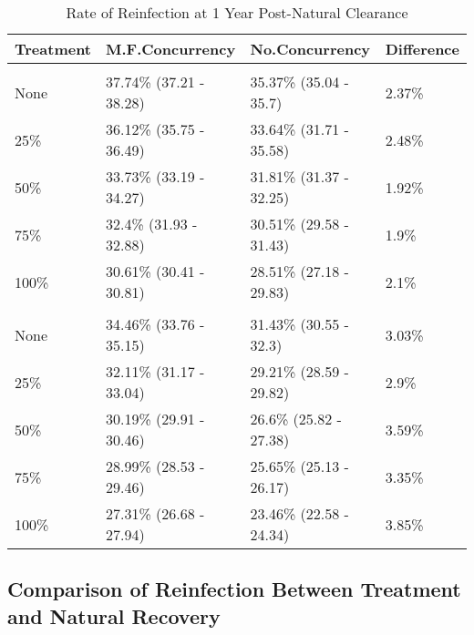 \documentclass [11pt, proquest] {uwthesis}[2015/03/03]
\begin{document}
\begin{table}

\caption{\label{tab:natclear6}Rate of Reinfection at 1 Year Post-Natural Clearance}
\centering
\begin{tabular}[t]{llll}
\toprule
Treatment & M.F.Concurrency & No.Concurrency & Difference\\
\midrule
\addlinespace[0.3em]
\multicolumn{4}{l}{\textbf{Females}}\\
\hspace{1em}None & 37.74\% (37.21 - 38.28) & 35.37\% (35.04 - 35.7) & 2.37\%\\
\hspace{1em}25\% & 36.12\% (35.75 - 36.49) & 33.64\% (31.71 - 35.58) & 2.48\%\\
\hspace{1em}50\% & 33.73\% (33.19 - 34.27) & 31.81\% (31.37 - 32.25) & 1.92\%\\
\hspace{1em}75\% & 32.4\% (31.93 - 32.88) & 30.51\% (29.58 - 31.43) & 1.9\%\\
\hspace{1em}100\% & 30.61\% (30.41 - 30.81) & 28.51\% (27.18 - 29.83) & 2.1\%\\
\addlinespace[0.3em]
\multicolumn{4}{l}{\textbf{Males}}\\
\hspace{1em}None & 34.46\% (33.76 - 35.15) & 31.43\% (30.55 - 32.3) & 3.03\%\\
\hspace{1em}25\% & 32.11\% (31.17 - 33.04) & 29.21\% (28.59 - 29.82) & 2.9\%\\
\hspace{1em}50\% & 30.19\% (29.91 - 30.46) & 26.6\% (25.82 - 27.38) & 3.59\%\\
\hspace{1em}75\% & 28.99\% (28.53 - 29.46) & 25.65\% (25.13 - 26.17) & 3.35\%\\
\hspace{1em}100\% & 27.31\% (26.68 - 27.94) & 23.46\% (22.58 - 24.34) & 3.85\%\\
\bottomrule
\end{tabular}
\end{table}
\hypertarget{comparison-of-reinfection-between-treatment-and-natural-recovery}{%
\subsection{Comparison of Reinfection Between Treatment and Natural Recovery}\label{comparison-of-reinfection-between-treatment-and-natural-recovery}}
\end{document}
